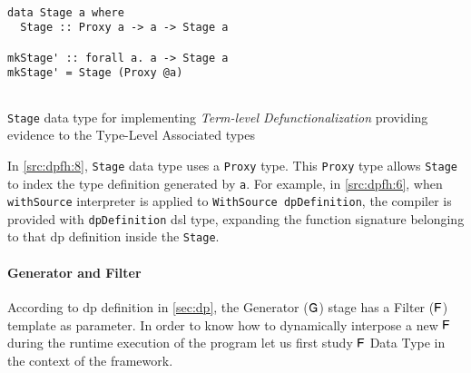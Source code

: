\begin{listing}[h!]
 \scriptsize{
  \begin{verbatim}

data Stage a where
  Stage :: Proxy a -> a -> Stage a

mkStage' :: forall a. a -> Stage a
mkStage' = Stage (Proxy @a)
    
  \end{verbatim}
  }
  \caption[{[\texttt{Stage.hs}] Stage Data Type}]{\texttt{Stage} data type for implementing \emph{Term-level Defunctionalization} providing evidence to the Type-Level Associated types}
  \label{src:dpfh:8}
\end{listing}

In \autoref{src:dpfh:8}, \texttt{Stage} data type uses a \texttt{Proxy} type. 
This \texttt{Proxy} type allows \texttt{Stage} to index the type definition generated by \texttt{a}.
For example, in \autoref{src:dpfh:6}, when \texttt{withSource} interpreter is applied to \texttt{WithSource dpDefinition},  
the compiler is provided with \texttt{dpDefinition} \acrshort{dsl} type, expanding the function signature belonging to that \acrshort{dp} definition inside the \texttt{Stage}.

\paragraph{Generator and Filter}
According to \acrshort{dp} definition in \autoref{sec:dp}, the Generator ($\mathsf{G}$) stage has a Filter ($\mathsf{F}$) template as parameter. In order to know how to dynamically interpose a new $\mathsf{F}$ during the runtime execution of the program let us first study $\mathsf{F}$ Data Type in the context of the framework.

